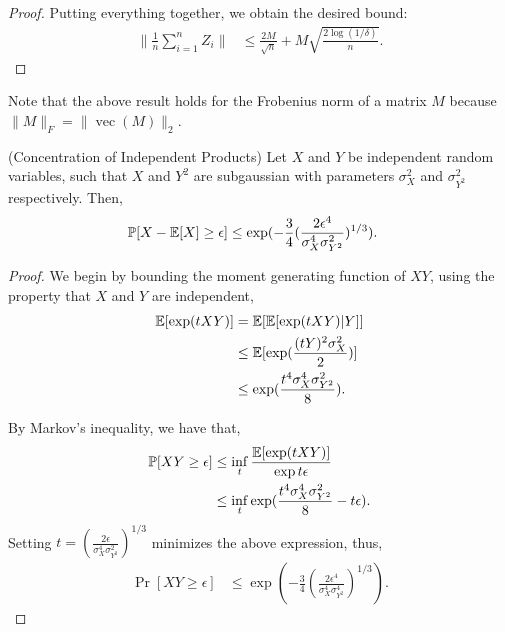 \documentclass[tablecaption=bottom]{jmlr}
\DeclareMathOperator{\vvec} {vec}
\begin{document}
\begin{proof}
Putting everything together, we obtain the desired bound:
\begin{align}
\|\frac{1}{n}\sum_{i=1}^n Z_i\|
&\le \frac{2M}{\sqrt{n}} + M \sqrt{\frac{2\log(1/\delta)}{n}}.
\end{align}
\end{proof}


Note that the above result holds for the Frobenius norm of a matrix
$M$ because $\|M\|_F = \|\vvec(M)\|_2$.

\begin{lemma}(Concentration of Independent Products)
  \label{lemma:conc-prod}
  Let $X$ and $Y$ be independent random variables, such that $X$ and $Y^2$ are subgaussian with parameters $\sigma^2_X$ and $\sigma^2_{Y^2}$ respectively.
  Then, 
  \begin{align}
    \mathbb{P}[ X - \operatorname{\mathbb{E}}[X] \ge \epsilon ] 
      &\le \exp( -\frac{3}{4} (\frac{2\epsilon^4}{\sigma^4_X \sigma^2_{Y^2}} )^{1/3} ).
  \end{align}
\end{lemma}
\begin{proof}
  We begin by bounding the moment generating function of $XY$, using the property that $X$ and $Y$ are independent,
  \begin{align}
    \operatorname{\mathbb{E}}[ \exp(t X Y) ] 
      &= \operatorname{\mathbb{E}}[ \operatorname{\mathbb{E}}[ \exp(t X Y) | Y ] ] \\
      &\le \operatorname{\mathbb{E}}[ \exp(\frac{(tY)^2 \sigma^2_X}{2}) ] \\
      &\le \exp(\frac{t^4 \sigma^4_X \sigma^2_{Y^2} }{8}).
  \end{align}

  By Markov's inequality, we have that,
  \begin{align}
    \mathbb{P}[ XY \ge \epsilon ] 
      &\le \inf_t \frac{\operatorname{\mathbb{E}}[\exp(t XY)]}{\exp{t\epsilon}} \\
      &\le \inf_t \exp(\frac{t^4 \sigma^4_X \sigma^2_{Y^2} }{8} - t\epsilon).
  \end{align}
  Setting $t = (\frac{2\epsilon}{\sigma^4_X \sigma^2_{Y^2}})^{1/3}$ minimizes the above expression, thus,
  \begin{align}
    \Pr[ XY \ge \epsilon ] 
      &\le \exp( -\frac{3}{4} (\frac{2\epsilon^4}{\sigma^4_X \sigma^4_{Y^2}} )^{1/3} ).
  \end{align}
\end{proof}
\end{document}
